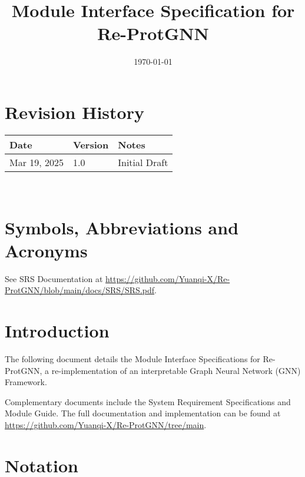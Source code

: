 \documentclass[12pt, titlepage]{article}
\begin{document}
\title{Module Interface Specification for Re-ProtGNN}

\author{\authname}

\date{\today}

\maketitle


\section{Revision History}

\begin{tabularx}{\textwidth}{p{3cm}p{2cm}X}
\toprule {\bf Date} & {\bf Version} & {\bf Notes}\\
\midrule
Mar 19, 2025 & 1.0 & Initial Draft\\
\bottomrule
\end{tabularx}

~\newpage

\section{Symbols, Abbreviations and Acronyms}

See SRS Documentation at \url{https://github.com/Yuanqi-X/Re-ProtGNN/blob/main/docs/SRS/SRS.pdf}.

\newpage

\tableofcontents

\newpage


\section{Introduction}

The following document details the Module Interface Specifications for Re-ProtGNN, a re-implementation of an interpretable Graph Neural Network (GNN) Framework.

Complementary documents include the System Requirement Specifications
and Module Guide.  The full documentation and implementation can be
found at \url{https://github.com/Yuanqi-X/Re-ProtGNN/tree/main}.

\section{Notation}
\end{document}
